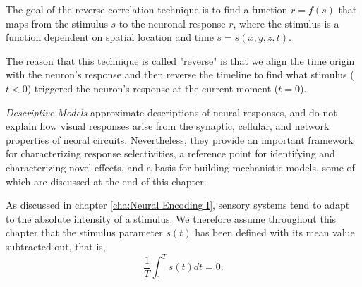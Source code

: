 \begin{rem}
  The goal of the reverse-correlation technique is to find a function $r = f(s)$ that maps from the stimulus $s$ to the neuronal response $r$, where the stimulus is a function dependent on spatial location and time $s = s(x,y,z,t)$. 
\end{rem}

\begin{rem}
  The reason that this technique is called "reverse" is that we align the time origin with the neuron's response and then reverse the timeline to find what stimulus ($t<0$) triggered the neuron's response at the current moment ($t=0$).
\end{rem}

\begin{ntn}%
  \label{ntn: typesOfModels}
  \emph{Descriptive Models} approximate descriptions of neural responses,
  and do not explain how visual responses arise from the synaptic,
  cellular, and network properties of neoral circuits.
  Nevertheless, they provide an important framework for characterizing response selectivities,
  a reference point for identifying and characterizing novel effects,
  and a basis for building mechanistic models,
  some of which are discussed at the end of this chapter.
\end{ntn}

\begin{asm}
  \label{asm:stimulus}
  As discussed in chapter \ref{cha:Neural Encoding I}, sensory systems tend to adapt to the absolute intensity of a stimulus. We therefore assume throughout this chapter that the stimulus parameter $s(t)$ has been defined with its mean value subtracted out, that is,
  \begin{equation}
    \label{equ:adaptionAssumption}
    \frac{1}{T}\int_0^Ts(t)dt = 0.
  \end{equation}
\end{asm}

